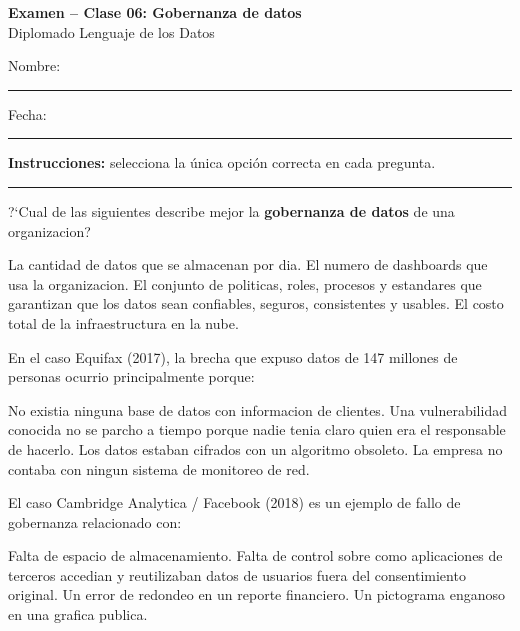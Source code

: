 \documentclass[12pt,addpoints]{exam}
\begin{document}
\begin{center}
  {\color{molMorado}\Large\bfseries Examen -- Clase 06: Gobernanza de datos}\\[3pt]
  {\color{molTeal}\large Diplomado Lenguaje de los Datos}
\end{center}

\vspace{6pt}
\noindent Nombre: \rule{6cm}{0.4pt} \hfill Fecha: \rule{3cm}{0.4pt}

\vspace{6pt}
\noindent\textbf{Instrucciones:} selecciona la \'unica opci\'on correcta en cada
pregunta.

\vspace{4pt}
\hrule
\vspace{8pt}

\begin{questions}

\question[1] ?`Cual de las siguientes describe mejor la \textbf{gobernanza de
datos} de una organizacion?
\begin{choices}
  \choice La cantidad de datos que se almacenan por dia.
  \choice El numero de dashboards que usa la organizacion.
  \CorrectChoice El conjunto de politicas, roles, procesos y estandares que
    garantizan que los datos sean confiables, seguros, consistentes y
    usables.
  \choice El costo total de la infraestructura en la nube.
\end{choices}

\question[1] En el caso Equifax (2017), la brecha que expuso datos de 147
millones de personas ocurrio principalmente porque:
\begin{choices}
  \choice No existia ninguna base de datos con informacion de clientes.
  \CorrectChoice Una vulnerabilidad conocida no se parcho a tiempo porque
    nadie tenia claro quien era el responsable de hacerlo.
  \choice Los datos estaban cifrados con un algoritmo obsoleto.
  \choice La empresa no contaba con ningun sistema de monitoreo de red.
\end{choices}

\question[1] El caso Cambridge Analytica / Facebook (2018) es un ejemplo de
fallo de gobernanza relacionado con:
\begin{choices}
  \choice Falta de espacio de almacenamiento.
  \CorrectChoice Falta de control sobre como aplicaciones de terceros
    accedian y reutilizaban datos de usuarios fuera del consentimiento
    original.
  \choice Un error de redondeo en un reporte financiero.
  \choice Un pictograma enganoso en una grafica publica.
\end{choices}


\end{questions}
\end{document}
